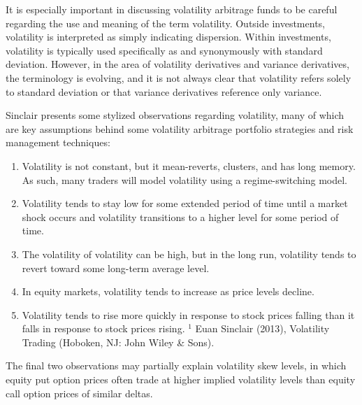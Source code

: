 \documentclass[11pt]{article}
\begin{document}
It is especially important in discussing volatility arbitrage funds to be careful regarding the use and meaning of the term volatility. Outside investments, volatility is interpreted as simply indicating dispersion. Within investments, volatility is typically used specifically as and synonymously with standard deviation. However, in the area of volatility derivatives and variance derivatives, the terminology is evolving, and it is not always clear that volatility refers solely to standard deviation or that variance derivatives reference only variance.

Sinclair presents some stylized observations regarding volatility, many of which are key assumptions behind some volatility arbitrage portfolio strategies and risk management techniques:

\begin{enumerate}
  \item Volatility is not constant, but it mean-reverts, clusters, and has long memory. As such, many traders will model volatility using a regime-switching model.

  \item Volatility tends to stay low for some extended period of time until a market shock occurs and volatility transitions to a higher level for some period of time.

  \item The volatility of volatility can be high, but in the long run, volatility tends to revert toward some long-term average level.

  \item In equity markets, volatility tends to increase as price levels decline.

  \item Volatility tends to rise more quickly in response to stock prices falling than it falls in response to stock prices rising. ${ }^{1}$ Euan Sinclair (2013), Volatility Trading (Hoboken, NJ: John Wiley \& Sons).

\end{enumerate}

The final two observations may partially explain volatility skew levels, in which equity put option prices often trade at higher implied volatility levels than equity call option prices of similar deltas.
\end{document}
